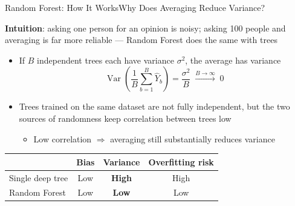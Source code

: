 \documentclass[dvipsnames,hyperref={pdfpagelabels=false}]{beamer}
\begin{document}
\begin{frame}{Random Forest: How It Works}{Why Does Averaging Reduce Variance?}

\textbf{Intuition}: asking one person for an opinion is noisy; asking 100 people and averaging is far more reliable --- Random Forest does the same with trees

\vspace{0.3cm}
\begin{itemize}
  \item If $B$ independent trees each have variance $\sigma^2$, the average has variance
  \begin{equation*}
    \operatorname{Var}\!\left(\frac{1}{B}\sum_{b=1}^{B}\hat{Y}_{b}\right)
    = \frac{\sigma^2}{B} \;\xrightarrow{B\to\infty}\; 0
  \end{equation*}

  \item Trees trained on the same dataset are not fully independent, but the two sources of randomness keep correlation between trees low
  \vspace{0.1cm}
  \begin{itemize}
    \item Low correlation $\Rightarrow$ averaging still substantially reduces variance
  \end{itemize}
\end{itemize}

\vspace{0.3cm}
\begin{center}
\begin{tabular}{lccc}
  \toprule
                   & Bias & Variance       & Overfitting risk \\
  \midrule
  Single deep tree & Low  & \textbf{High}  & High \\
  Random Forest    & Low  & \textbf{Low}   & Low  \\
  \bottomrule
\end{tabular}
\end{center}
\end{frame}
\end{document}
